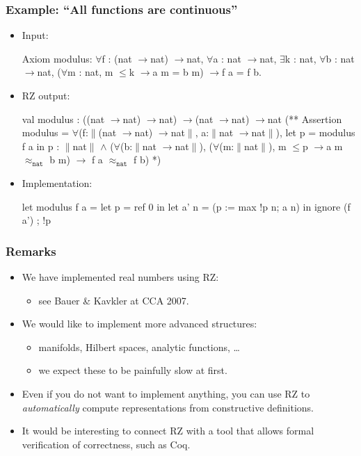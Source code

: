 \documentclass[t]{beamer}
\newcommand{\iTo}{{\ensuremath{\to}}}
\newcommand{\iForall}{$\forall$}
\newcommand{\iAnd}{$\land$}
\newcommand{\iExists}{$\exists$}
\newcommand{\iT}[1]{$\|$#1$\|$}
\newcommand{\iPer}[1]{$\approx_{\mathtt{#1}}$}
\newcommand{\iLeq}{$\leq$}
\begin{document}
\begin{frame}[fragile]
  \frametitle{Example: ``All functions are continuous''}

  \begin{itemize}[<+->]
  \item 
    Input:
%
\begin{sourcex}
Axiom modulus:
\iForall f : (nat \iTo nat) \iTo nat, \iForall a : nat \iTo nat,
  \iExists k : nat, \iForall b : nat \iTo nat,
    (\iForall m : nat, m \iLeq k \iTo a m = b m) \iTo f a = f b.
\end{sourcex}
%
\item RZ output:
%
\begin{sourcex}
val modulus : ((nat \iTo nat) \iTo nat) \iTo (nat \iTo nat) \iTo nat
(**  Assertion modulus = 
  \iForall (f:\iT{(nat \iTo nat) \iTo nat}, a:\iT{nat \iTo nat}), 
    let p = modulus f a in p : \iT{nat} \iAnd 
    (\iForall (b:\iT{nat \iTo nat}), 
       (\iForall (m:\iT{nat}), m \iLeq p \iTo a m \iPer{nat} b m) \iTo
       f a \iPer{nat} f b) *)
\end{sourcex}
\item Implementation:
%
\begin{source}
let modulus f a =
  let p = ref 0 in
  let a' n = (p := max !p n; a n) in
    ignore (f a') ; !p
\end{source}
\end{itemize}


\end{frame}

\begin{frame}
  \frametitle{Remarks}

  \begin{itemize}
  \item We have implemented real numbers using RZ:
    \begin{itemize}[<.->]
    \item see Bauer \& Kavkler at CCA 2007.
    \end{itemize}
  \item We would like to implement more advanced structures:
    \begin{itemize}[<.->]
    \item manifolds, Hilbert spaces, analytic functions, \ldots
    \item we expect these to be painfully slow at first.
    \end{itemize}
  \item Even if you do not want to implement anything, you can use RZ
    to \emph{automatically} compute representations from constructive
    definitions.
  \item It would be interesting to connect RZ with a tool that allows
    formal verification of correctness, such as Coq.
  \end{itemize}

\end{frame}
\end{document}
